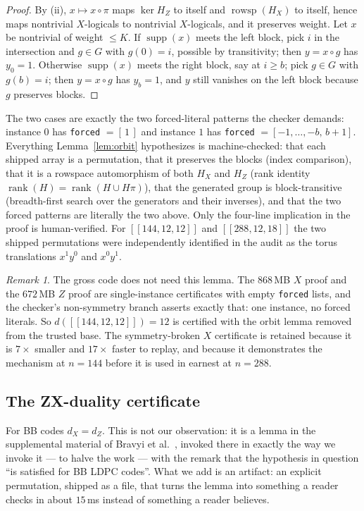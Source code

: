 \documentclass[11pt]{amsart}
\newcommand{\rowsp}{\operatorname{rowsp}}
\newcommand{\rank}{\operatorname{rank}}
\newcommand{\supp}{\operatorname{supp}}
\newcommand{\HX}{H_{X}}
\newcommand{\HZ}{H_{Z}}
\newcommand{\dX}{d_{X}}
\newcommand{\dZ}{d_{Z}}
\newcommand{\gross}{[[144,12,12]]}
\theoremstyle{plain}
\theoremstyle{definition}
\theoremstyle{remark}
\newtheorem{remark}[theorem]{Remark}
\begin{document}
\begin{proof}
By (ii), $x\mapsto x\circ\pi$ maps $\ker\HZ$ to itself and $\rowsp(\HX)$ to
itself, hence maps nontrivial $X$-logicals to nontrivial $X$-logicals, and it
preserves weight. Let $x$ be nontrivial of weight $\le K$. If
$\supp(x)$ meets the left block, pick $i$ in the intersection and $g\in G$
with $g(0)=i$, possible by transitivity; then $y=x\circ g$ has $y_{0}=1$.
Otherwise $\supp(x)$ meets the right block, say at $i\ge b$; pick $g\in G$
with $g(b)=i$; then $y=x\circ g$ has $y_{b}=1$, and $y$ still vanishes on the
left block because $g$ preserves blocks.
\end{proof}

The two cases are exactly the two forced-literal patterns the checker demands:
instance $0$ has \texttt{forced} $=[\,1\,]$ and instance $1$ has
\texttt{forced} $=[-1,\dots,-b,\,b+1]$. Everything Lemma~\ref{lem:orbit}
hypothesizes is machine-checked: that each shipped array is a permutation, that
it preserves the blocks (index comparison), that it is a rowspace automorphism
of both $\HX$ and $\HZ$ (rank identity $\rank(H)=\rank(H\cup H\pi)$),
that the generated group is block-transitive (breadth-first search over the
generators and their inverses), and that the two forced patterns are literally
the two above. Only the four-line implication in the proof is human-verified.
For $\gross$ and $[[288,12,18]]$ the two shipped permutations were
independently identified in the audit as the torus translations $x^{1}y^{0}$
and $x^{0}y^{1}$.

\begin{remark}\label{rem:symfree}
The gross code does not need this lemma. The $868$\,MB $X$ proof and the
$672$\,MB $Z$ proof are single-instance certificates with empty
\texttt{forced} lists, and the checker's non-symmetry branch asserts exactly
that: one instance, no forced literals. So $d(\gross)=12$ is certified with
the orbit lemma removed from the trusted base. The symmetry-broken $X$
certificate is retained because it is $7\times$ smaller and $17\times$ faster
to replay, and because it demonstrates the mechanism at $n=144$ before it is
used in earnest at $n=288$.
\end{remark}

\subsection{The ZX-duality certificate}\label{ssec:duality}
For BB codes $\dX=\dZ$. This is not our observation: it is a lemma in the
supplemental material of Bravyi et al.\ \cite{BCGMRY}, invoked there in
exactly the way we invoke it --- to halve the work --- with the remark that
the hypothesis in question ``is satisfied for BB LDPC codes''. What we add is
an artifact: an explicit permutation, shipped as a file, that turns the lemma
into something a reader checks in about $15$\,ms instead of something a reader
believes.
\end{document}

